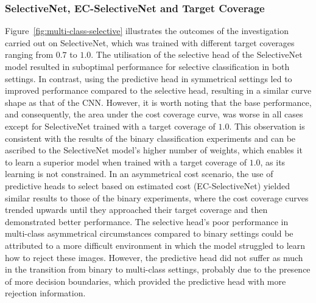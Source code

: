 \subsubsection{SelectiveNet, EC-SelectiveNet and Target Coverage}
Figure~\ref{fig:multi-class-selective} illustrates the outcomes of the investigation carried out on SelectiveNet, which was trained with different target coverages ranging from $0.7$ to $1.0$. The utilisation of the selective head of the SelectiveNet model resulted in suboptimal performance for selective classification in both settings. In contrast, using the predictive head in symmetrical settings led to improved performance compared to the selective head, resulting in a similar curve shape as that of the CNN. However, it is worth noting that the base performance, and consequently, the area under the cost coverage curve, was worse in all cases except for SelectiveNet trained with a target coverage of $1.0$. This observation is consistent with the results of the binary classification experiments and can be ascribed to the SelectiveNet model's higher number of weights, which enables it to learn a superior model when trained with a target coverage of $1.0$, as its learning is not constrained. In an asymmetrical cost scenario, the use of predictive heads to select based on estimated cost (EC-SelectiveNet) yielded similar results to those of the binary experiments, where the cost coverage curves trended upwards until they approached their target coverage and then demonstrated better performance. The selective head's poor performance in multi-class asymmetrical circumstances compared to binary settings could be attributed to a more difficult environment in which the model struggled to learn how to reject these images. However, the predictive head did not suffer as much in the transition from binary to multi-class settings, probably due to the presence of more decision boundaries, which provided the predictive head with more rejection information.

